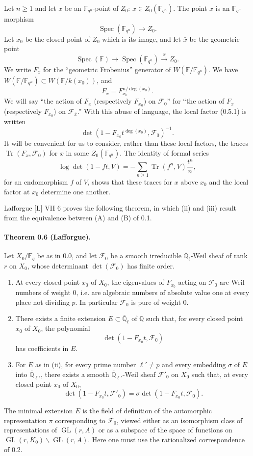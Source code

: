 \documentclass[10pt]{article}
\newcommand{\F}{\mathbb{F}}
\newcommand{\Q}{\mathbb{Q}}
\newcommand{\Ql}{\overline{\mathbb Q}_{\ell}}
\newcommand{\Tr}{\operatorname{Tr}}
\newcommand{\Spec}{\operatorname{Spec}}
\newcommand{\GL}{\operatorname{GL}}
\begin{document}
Let $n\ge 1$ and let $x$ be an $\F_{q^n}$-point of $Z_0$: $x\in Z_0(\F_{q^n})$.
The point $x$ is an $\F_q$-morphism
\[
 \Spec(\F_{q^n})\longrightarrow Z_0.
\]
Let $x_0$ be the closed point of $Z_0$ which is its image, and let $\bar x$ be the geometric point
\[
 \Spec(\F)\longrightarrow\Spec(\F_{q^n})\xrightarrow{x}Z_0.
\]
We write $F_x$ for the ``geometric Frobenius'' generator of $W(\F/\F_{q^n})$.
We have $W(\F/\F_{q^n})\subset W(\F/k(x_0))$, and
\begin{equation}
F_x=F_{x_0}^{n/\deg(x_0)}.
\tag{0.5.2}
\end{equation}
We will say ``the action of $F_x$ (respectively $F_{x_0}$) on $\mathcal F_0$'' for ``the action of $F_x$ (respectively $F_{x_0}$) on $\mathcal F_{\bar x}$.''
With this abuse of language, the local factor (0.5.1) is written
\[
\det\left(1-F_{x_0}t^{\deg(x_0)},\mathcal F_0\right)^{-1}.
\]
It will be convenient for us to consider, rather than these local factors, the traces $\Tr(F_x,\mathcal F_0)$ for $x$ in some $Z_0(\F_{q^n})$.
The identity of formal series
\[
 \log\det(1-ft,V)=-\sum_{n\ge1}\Tr(f^n,V)\frac{t^n}{n},
\]
for an endomorphism $f$ of $V$, shows that these traces for $x$ above $x_0$ and the local factor at $x_0$ determine one another.

Lafforgue [L] VII 6 proves the following theorem, in which (ii) and (iii) result from the equivalence between (A) and (B) of 0.1.

\paragraph{Theorem 0.6 (Lafforgue).}
Let $X_0/\F_q$ be as in 0.0, and let $\mathcal F_0$ be a smooth irreducible $\Ql$-Weil sheaf of rank $r$ on $X_0$, whose determinant $\det(\mathcal F_0)$ has finite order.
\begin{enumerate}[label=(\roman*)]
\item At every closed point $x_0$ of $X_0$, the eigenvalues of $F_{x_0}$ acting on $\mathcal F_0$ are Weil numbers of weight $0$, i.e. are algebraic numbers of absolute value one at every place not dividing $p$. In particular $\mathcal F_0$ is pure of weight $0$.
\item There exists a finite extension $E\subset\Ql$ of $\Q$ such that, for every closed point $x_0$ of $X_0$, the polynomial
\[
 \det(1-F_{x_0}t,\mathcal F_0)
\]
has coefficients in $E$.
\item For $E$ as in (ii), for every prime number $\ell'\ne p$ and every embedding $\sigma$ of $E$ into $\overline{\mathbb Q}_{\ell'}$, there exists a smooth $\overline{\mathbb Q}_{\ell'}$-Weil sheaf $\mathcal F'_0$ on $X_0$ such that, at every closed point $x_0$ of $X_0$,
\[
 \det(1-F_{x_0}t,\mathcal F'_0)=\sigma\det(1-F_{x_0}t,\mathcal F_0).
\]
\end{enumerate}
The minimal extension $E$ is the field of definition of the automorphic representation $\pi$ corresponding to $\mathcal F_0$, viewed either as an isomorphism class of representations of $\GL(r,A)$ or as a subspace of the space of functions on $\GL(r,K_0)\backslash\GL(r,A)$.
Here one must use the rationalized correspondence of 0.2.
\end{document}
